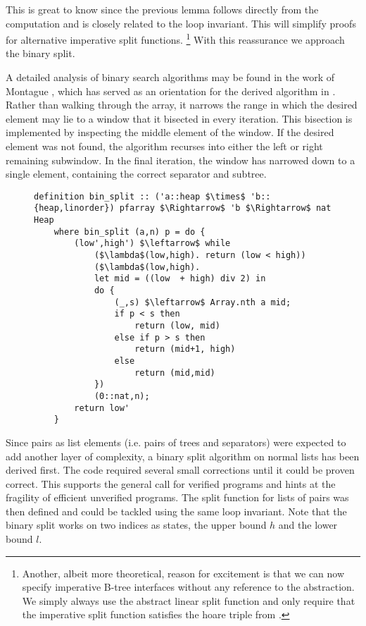 This is great to know since the previous lemma
follows directly from the computation and is closely related
to the loop invariant.
This will simplify proofs for alternative imperative split functions.
\footnote{
    Another, albeit more theoretical,
    reason for excitement is that we can now specify imperative B-tree
    interfaces without any reference to the abstraction.
    We simply always use the abstract linear split function
    and only require that the imperative split function satisfies
    the hoare triple from .
}
With this reassurance we approach the binary split.

A detailed analysis of binary search algorithms
may be found in the work of Montague \parencite{DBLP:journals/csedu/Montague91},
which has served as an orientation
for the derived algorithm in .
Rather than walking through the array,
it narrows the range in which the desired element may lie
to a window that it bisected in every iteration.
This bisection is implemented by inspecting the middle element of the window.
If the desired element was not found, the algorithm
recurses into either the left or right remaining subwindow.
In the final iteration,
the window has narrowed down to a single element,
containing the correct separator and subtree.

\begin{figure}
\begin{lstlisting}[mathescape=true, language=Isabelle, caption={The imperative binary split},
    label={lst:imp-binary-split}]
definition bin_split :: ('a::heap $\times$ 'b::{heap,linorder}) pfarray $\Rightarrow$ 'b $\Rightarrow$ nat Heap 
    where bin_split (a,n) p = do { 
        (low',high') $\leftarrow$ while  
            ($\lambda$(low,high). return (low < high))  
            ($\lambda$(low,high).
            let mid = ((low  + high) div 2) in 
            do { 
                (_,s) $\leftarrow$ Array.nth a mid; 
                if p < s then 
                    return (low, mid) 
                else if p > s then 
                    return (mid+1, high) 
                else
                    return (mid,mid) 
            })  
            (0::nat,n); 
        return low' 
    }
\end{lstlisting}
\end{figure}

Since pairs as list elements (i.e. pairs of trees and separators)
were expected to add another layer of complexity,
a binary split algorithm on normal lists has been derived first.
The code required several small corrections
until it could be proven correct.
This supports the general call
for verified programs and hints at the fragility
of efficient unverified programs.
The split function for lists of pairs was then defined
and could be tackled using the same loop invariant.
Note that the binary split works on two indices
as states, the upper bound $h$ and the lower bound $l$.

